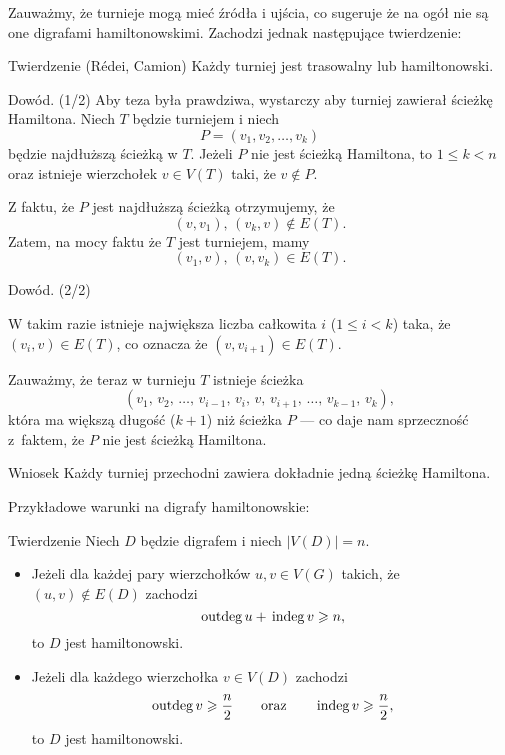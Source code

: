 \documentclass[a4paper,10pt]{beamer}
\newcommand{\outdeg}{{\,\rm{outdeg}\,}}
\newcommand{\indeg}{{\,\rm{indeg}\,}}
\begin{document}
\begin{frame}

Zauważmy, że turnieje mogą mieć źródła i ujścia, co sugeruje że na ogół nie są one digrafami hamiltonowskimi. Zachodzi jednak następujące twierdzenie:

\begin{block}{Twierdzenie (R\'{e}dei, Camion)}
Każdy turniej jest trasowalny lub hamiltonowski.
\end{block}

\begin{block}{Dowód. (1/2)}
Aby teza była prawdziwa, wystarczy aby turniej zawierał ścieżkę Hamiltona. Niech $T$ będzie turniejem i niech $$P=(v_1,v_2,\ldots,v_k)$$ będzie najdłuższą ścieżką w $T$. Jeżeli $P$ nie jest ścieżką Hamiltona, to $1\leqslant k<n$ oraz istnieje wierzchołek $v\in V(T)$ taki, że $v\not\in P$.

Z faktu, że $P$ jest najdłuższą ścieżką otrzymujemy, że $$(v,v_1),\,(v_k,v)\not\in E(T).$$ Zatem, na mocy faktu że $T$ jest turniejem, mamy $$(v_1,v),\,(v,v_k)\in E(T).$$ 
\end{block}
\end{frame}


\begin{frame}

\begin{block}{Dowód. (2/2)}

W takim razie istnieje największa liczba całkowita $i$ ($1\leqslant i<k$) taka, że $(v_i,v)\in E(T)$, co oznacza że $(v,v_{i+1})\in E(T)$. 



Zauważmy, że teraz w turnieju $T$ istnieje ścieżka
$$(v_1,\,v_2,\,\ldots,\,v_{i-1},\,v_i,\,v,\,v_{i+1},\,\ldots,\,v_{k-1},\,v_k),$$
która ma większą długość ($k+1$) niż ścieżka $P$ --- co daje nam sprzeczność z~faktem, że $P$ nie jest ścieżką Hamiltona.
\end{block}


\end{frame}


\begin{frame}


\begin{block}{Wniosek}
Każdy turniej przechodni zawiera dokładnie jedną ścieżkę Hamiltona.
\end{block}

\bigskip

Przykładowe warunki na digrafy hamiltonowskie:

\begin{block}{Twierdzenie}
Niech $D$ będzie digrafem i niech $|V(D)|=n$.
\begin{itemize}
\item Jeżeli dla każdej pary wierzchołków $u,v\in V(G)$ takich, że $(u,v)\not\in E(D)$ zachodzi
$$\outdeg u+\indeg v \geqslant n,$$
to $D$ jest hamiltonowski.
\item Jeżeli dla każdego wierzchołka $v\in V(D)$ zachodzi $$\outdeg v\geqslant \frac{n}2\ \ \ \ \ \mbox{ oraz }\ \ \ \ \ \indeg v\geqslant\frac{n}2,$$
to $D$ jest hamiltonowski.
\end{itemize}
\end{block}

\end{frame}
\end{document}
